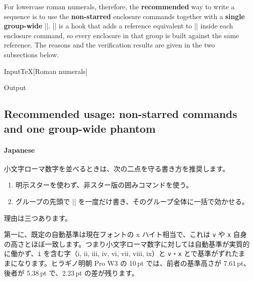 \documentclass[luatex,fontsize=8pt,paper=b5,twoside]{jlreq}%
\begin{document}
For lowercase roman numerals, therefore, the \textbf{recommended} way to write a sequence is to use the \textbf{non-starred} enclosure commands together with a \textbf{single group-wide} \KKverb||. \KKverb|\kksref| is a hook that adds a reference equivalent to \KKverb|| inside each enclosure command, so every enclosure in that group is built against the same reference. The reasons and the verification results are given in the two subsections below.

\begin{SourceCode}{Input}{TeX}[Roman numerals]


  {%
    }
\end{SourceCode}
\begin{OutPut}{Output}
  \quad
  \quad
  {%
    }
\end{OutPut}

\subsection{Recommended usage: non-starred commands and one group-wide phantom}
\paragraph{Japanese}
小文字ローマ数字を並べるときは、次の二点を守る書き方を推奨します。

\begin{enumerate}
  \item 明示スターを使わず、非スター版の囲みコマンドを使う。
  \item グループの先頭で \KKverb|| を一度だけ書き、そのグループ全体に一括で効かせる。
\end{enumerate}

理由は三つあります。

第一に、既定の自動基準は現在フォントの x ハイト相当で、これは \verb|v| や \verb|x| 自身の高さとほぼ一致します。つまり小文字ローマ数字に対しては自動基準が実質的に働かず、\verb|i| を含む字（i, ii, iii, iv, vi, vii, viii, ix）と \verb|v|・\verb|x| とで基準がずれたままになります。ヒラギノ明朝 Pro W3 の 10\,pt では、前者の基準高さが 7.61\,pt、後者が 5.38\,pt で、2.23\,pt の差が残ります。
\end{document}
